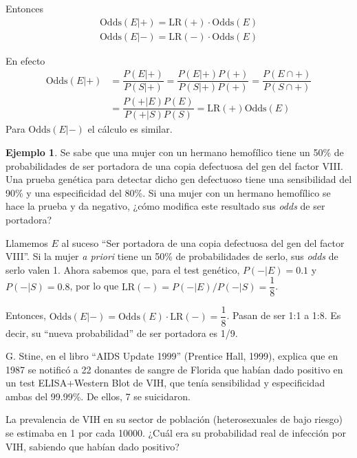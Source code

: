 \documentclass[
]{book}
\theoremstyle{definition}
\theoremstyle{definition}
\newtheorem{example}{Ejemplo}[chapter]
\theoremstyle{definition}
\theoremstyle{definition}
\theoremstyle{remark}
\begin{document}
Entonces
\[
\begin{array}{l}
\text{Odds}(E|+)=\text{LR}(+)\cdot \text{Odds}(E)\\
\text{Odds}(E|-)=\text{LR}(-)\cdot  \text{Odds}(E)
\end{array}
\]

\begin{rmdcorbes}
En efecto
\[
\begin{array}{rl}
\text{Odds}(E|+)\!\!\!\!\! & =\dfrac{P(E|+)}{P(S|+)}=\dfrac{P(E|+)P(+)}{P(S|+)P(+)} =\dfrac{P(E\cap +)}{P(S\cap +)}\\
& =\dfrac{P(+|E)P(E)}{P(+|S)P(S)}=\text{LR}(+)\text{Odds}(E)
\end{array}
\]
Para \(\text{Odds}(E|-)\) el cálculo es similar.
\end{rmdcorbes}

\begin{example}
\protect\hypertarget{exm:unnamed-chunk-163}{}\label{exm:unnamed-chunk-163}Se sabe que una mujer con un hermano hemofílico tiene un 50\% de probabilidades de ser portadora de una copia defectuosa del gen del factor VIII. Una prueba genética para detectar dicho gen defectuoso tiene una sensibilidad del 90\% y una especificidad del 80\%. Si una mujer con un hermano hemofílico se hace la prueba y da negativo, ¿cómo modifica este resultado sus \emph{odds} de ser portadora?
\end{example}

Llamemos \(E\) al suceso ``Ser portadora de una copia defectuosa del gen del factor VIII''. Si la mujer \emph{a priori} tiene un 50\% de probabilidades de serlo, sus \emph{odds} de serlo valen 1. Ahora sabemos que, para el test genético, \(P(-|E)=0.1\) y \(P(-|S)=0.8\), por lo que \(\text{LR}(-)=P(-|E)/P(-|S)=\dfrac{1}{8}\).

Entonces, \(\text{Odds}(E|-)=\text{Odds}(E)\cdot \text{LR}(-) =\dfrac{1}{8}\). Pasan de ser 1:1 a 1:8. Es decir, su ``nueva probabilidad'' de ser portadora es 1/9.

\begin{rmdexercici}
G. Stine, en el libro ``AIDS Update 1999'' (Prentice Hall, 1999), explica que en 1987 se notificó a 22 donantes de sangre de Florida que habían dado positivo en un test ELISA+Western Blot de VIH, que tenía sensibilidad y especificidad ambas del 99.99\%. De ellos, 7 se suicidaron.

La prevalencia de VIH en su sector de población (heterosexuales de bajo riesgo) se estimaba en 1 por cada 10000. ¿Cuál era su probabilidad real de infección por VIH, sabiendo que habían dado positivo?
\end{rmdexercici}
\end{document}

